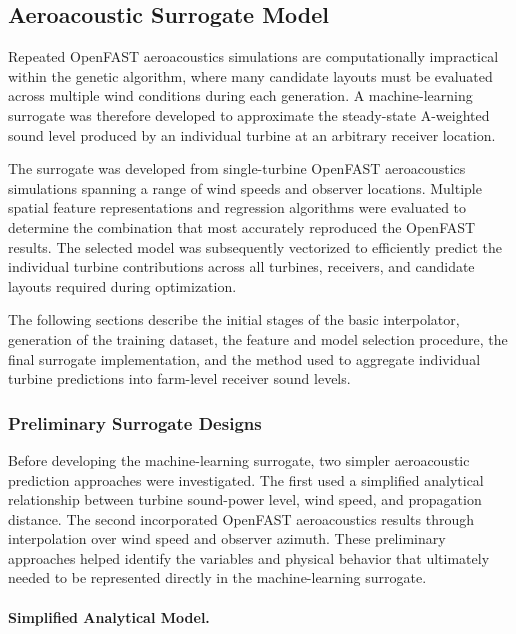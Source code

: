 \documentclass[11pt]{article}
\begin{document}
\subsection{Aeroacoustic Surrogate Model}
\label{ssec:aa-surrogate-model}

Repeated OpenFAST aeroacoustics simulations are computationally impractical within the genetic algorithm, where many candidate layouts must be evaluated across multiple wind conditions during each generation. A machine-learning surrogate was therefore developed to approximate the steady-state A-weighted sound level produced by an individual turbine at an arbitrary receiver location.

The surrogate was developed from single-turbine OpenFAST aeroacoustics simulations spanning a range of wind speeds and observer locations. Multiple spatial feature representations and regression algorithms were evaluated to determine the combination that most accurately reproduced the OpenFAST results. The selected model was subsequently vectorized to efficiently predict the individual turbine contributions across all turbines, receivers, and candidate layouts required during optimization.

The following sections describe the initial stages of the basic interpolator, generation of the training dataset, the feature and model selection procedure, the final surrogate implementation, and the method used to aggregate individual turbine predictions into farm-level receiver sound levels.

\subsubsection{Preliminary Surrogate Designs}

Before developing the machine-learning surrogate, two simpler aeroacoustic prediction approaches were investigated. The first used a simplified analytical relationship between turbine sound-power level, wind speed, and propagation distance. The second incorporated OpenFAST aeroacoustics results through interpolation over wind speed and observer azimuth. These preliminary approaches helped identify the variables and physical behavior that ultimately needed to be represented directly in the machine-learning surrogate.

\paragraph{Simplified Analytical Model.}
\end{document}
